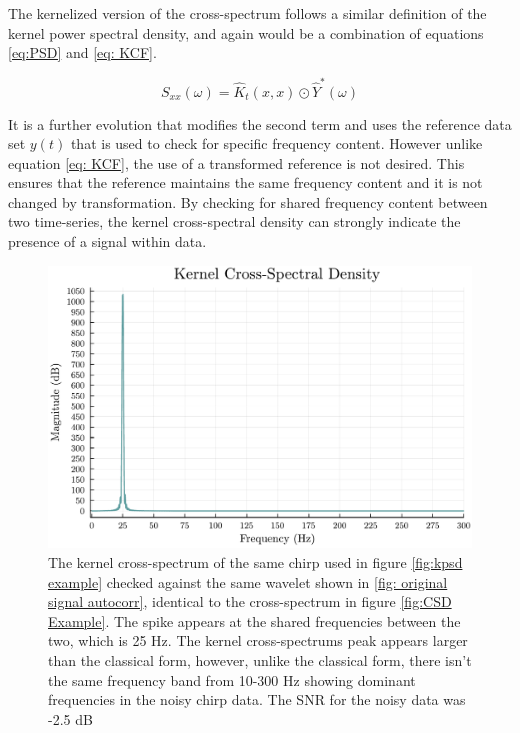     The kernelized version of the cross-spectrum follows a similar definition of the kernel power spectral density, and again would be a combination of equations \ref{eq:PSD} and \ref{eq: KCF}. 
    
    \begin{equation} \label{eq:KCSD}
        {S}_{xx}(\omega) = \hat{K}_t(x, x) \odot \hat{Y}^*(\omega)
    \end{equation}
    
    It is a further evolution that modifies the second term and uses the reference data set $y(t)$ that is used to check for specific frequency content. However unlike equation \ref{eq: KCF}, the use of a transformed reference is not desired. This ensures that the reference maintains the same frequency content and it is not changed by transformation. By checking for shared frequency content between two time-series, the kernel cross-spectral density can strongly indicate the presence of a signal within data. 

    \begin{figure}[h]
        \centering
        \includegraphics[scale = 0.5]{images/Formulation/KCSD example.pdf}
        \caption{The kernel cross-spectrum of the same chirp used in figure \ref*{fig:kpsd example} checked against the same wavelet shown in \ref{fig: original signal autocorr}, identical to the cross-spectrum in figure \ref{fig:CSD Example}. The spike appears at the shared frequencies between the two, which is 25 Hz. The kernel cross-spectrums peak appears larger than the classical form, however, unlike the classical form, there isn't the same frequency band from 10-300 Hz showing dominant frequencies in the noisy chirp data. The SNR for the noisy data was -2.5 dB}
        \label{fig:enter-label}
    \end{figure}